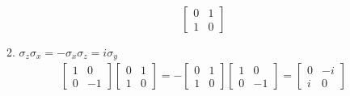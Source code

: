 \documentclass[12pt]{article}
\begin{document}
\begin{enumerate}[(a)]
\begin{enumerate}[]
\[\begin{bmatrix}
						0 & 1\\
						1 & 0
					\end{bmatrix}
				\]
			\item $ \sigma_z\sigma_x = -\sigma_x\sigma_z = i\sigma_y $
				\begin{align*}
					\begin{bmatrix}
						1 & 0\\
						0 & -1
					\end{bmatrix}
					\begin{bmatrix}
						0 & 1\\
						1 & 0
					\end{bmatrix}
					=-
					\begin{bmatrix}
						0 & 1\\
						1 & 0
					\end{bmatrix}
					\begin{bmatrix}
						1 & 0\\
						0 & -1
					\end{bmatrix}
					=
					\begin{bmatrix}
						0 & -i\\
						i & 0
					\end{bmatrix}
				\end{align*}			
		\end{enumerate}
	

\end{enumerate}
\end{document}
